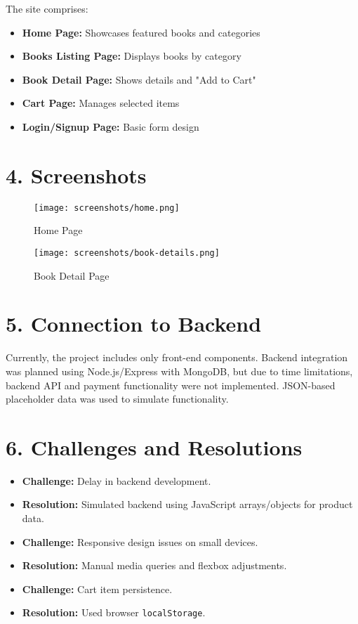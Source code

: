 \documentclass[12pt]{article}
\begin{document}
The site comprises:
\begin{itemize}
    \item \textbf{Home Page:} Showcases featured books and categories
    \item \textbf{Books Listing Page:} Displays books by category
    \item \textbf{Book Detail Page:} Shows details and "Add to Cart"
    \item \textbf{Cart Page:} Manages selected items
    \item \textbf{Login/Signup Page:} Basic form design
\end{itemize}

\section*{4. Screenshots}
\begin{figure}[h]
\centering
\texttt{[image: screenshots/home.png]}
\caption{Home Page}
\end{figure}

\begin{figure}[h]
\centering
\texttt{[image: screenshots/book-details.png]}
\caption{Book Detail Page}
\end{figure}

\section*{5. Connection to Backend}
Currently, the project includes only front-end components. Backend integration was planned using Node.js/Express with MongoDB, but due to time limitations, backend API and payment functionality were not implemented. JSON-based placeholder data was used to simulate functionality.

\section*{6. Challenges and Resolutions}
\begin{itemize}
    \item \textbf{Challenge:} Delay in backend development.
    \item \textbf{Resolution:} Simulated backend using JavaScript arrays/objects for product data.
    \item \textbf{Challenge:} Responsive design issues on small devices.
    \item \textbf{Resolution:} Manual media queries and flexbox adjustments.
    \item \textbf{Challenge:} Cart item persistence.
    \item \textbf{Resolution:} Used browser \texttt{localStorage}.
\end{itemize}
\end{document}
